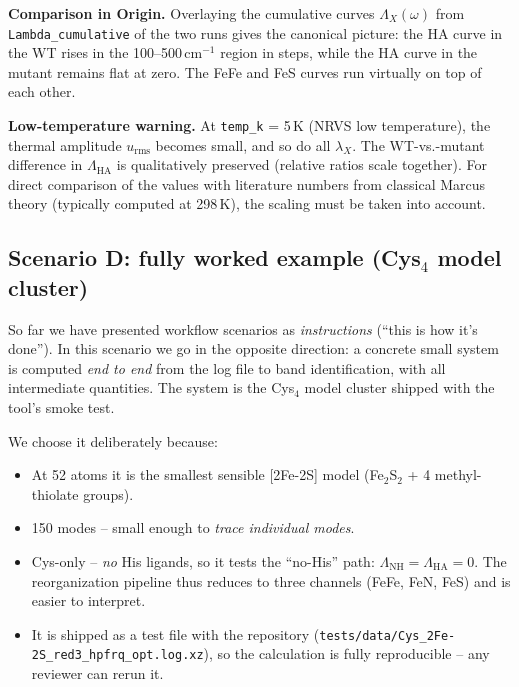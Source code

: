 \documentclass[11pt,a4paper,twoside]{article}
\theoremstyle{remark}
\begin{document}
\textbf{Comparison in Origin.} Overlaying the cumulative curves
$\Lambda_X(\omega)$ from \texttt{Lambda\_cumulative} of the two
runs gives the canonical picture: the HA curve in the WT rises in
the 100--500\,cm$^{-1}$ region in steps, while the HA curve in the
mutant remains flat at zero. The FeFe and FeS curves run virtually
on top of each other.

\begin{warnbox}
\textbf{Low-temperature warning.} At \texttt{temp\_k} = 5\,K
(NRVS low temperature), the thermal amplitude $u_\text{rms}$
becomes small, and so do all $\lambda_X$. The WT-vs.-mutant
difference in $\Lambda_\text{HA}$ is qualitatively preserved
(relative ratios scale together). For direct comparison of the
values with literature numbers from classical Marcus theory
(typically computed at 298\,K), the scaling must be taken into
account.
\end{warnbox}

\subsection{Scenario D: fully worked example (Cys$_4$ model cluster)}
\label{sec:workflow-worked-example}

So far we have presented workflow scenarios as \emph{instructions}
(``this is how it's done''). In this scenario we go in the
opposite direction: a concrete small system is computed
\emph{end to end} from the log file to band identification, with
all intermediate quantities. The system is the Cys$_4$ model
cluster shipped with the tool's smoke test.

We choose it deliberately because:
\begin{itemize}\setlength{\itemsep}{0pt}
  \item At 52 atoms it is the smallest sensible [2Fe-2S] model
        (Fe$_2$S$_2$ + 4 methyl-thiolate groups).
  \item 150 modes -- small enough to \emph{trace individual modes}.
  \item Cys-only -- \emph{no} His ligands, so it tests the
        ``no-His'' path: $\Lambda_\text{NH} = \Lambda_\text{HA} = 0$.
        The reorganization pipeline thus reduces to three channels
        (FeFe, FeN, FeS) and is easier to interpret.
  \item It is shipped as a test file with the repository
        (\texttt{tests/data/Cys\_2Fe-2S\_red3\_hpfrq\_opt.log.xz}),
        so the calculation is fully reproducible -- any reviewer
        can rerun it.
\end{itemize}
\end{document}
